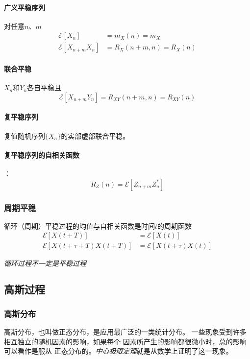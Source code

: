     \paragraph{广义平稳序列}对任意$n$、$m$\vspace{-0.5ex}
    \begin{align}
        \mathscr{E}[X_n]&=m_X(n)=m_X\\
        \mathscr{E}[X_{n+m}X_n]&=R_X(n+m,n)=R_X(n)
    \end{align}
    \paragraph{联合平稳}$X_n$和$Y_n$各自平稳且\vspace{-0.5ex}
    \begin{equation}
        \mathscr{E}[X_{n+m}Y_n]=R_{XY}(n+m,n)=R_{XY}(n)
    \end{equation}
    \paragraph{复平稳序列}复值随机序列$\{X_n\}$的实部虚部联合平稳。

    \paragraph{复平稳序列的自相关函数}：\vspace{-0.5ex}
    \begin{equation}
        R_Z(n)=\mathscr{E}[Z_{n+m}Z_n^*]
    \end{equation}

    \subsubsection{周期平稳}
    循环（周期）平稳过程的均值与自相关函数是时间$t$的周期函数\vspace{-0.5ex}
    \begin{align}
        \mathscr{E}[X(t+T)]&=\mathscr{E}[X(t)]\\
        \mathscr{E}[X(t+\tau+T)X(t+T)]&=\mathscr{E}[X(t+\tau)X(t)]
    \end{align}

    \emph{循环过程不一定是平稳过程}

\subsection{高斯过程}
    \subsubsection{高斯分布}
    高斯分布，也叫做正态分布，是应用最广泛的一类统计分布。
    一些现象受到许多相互独立的随机因素的影响，如果每个
    因素所产生的影响都很微小时，总的影响可以看作是服从
    正态分布的。\emph{中心极限定理}就是从数学上证明了这一现象。
    

